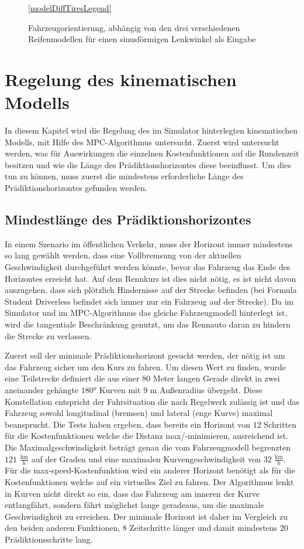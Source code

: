 \documentclass{like}
\begin{document}
\begin{figure}
	\centering
	 
	\ref{modelDiffTiresLegend}
	\caption{Fahrzeugorientierung, abhängig von den drei verschiedenen Reifenmodellen für einen sinusförmigen Lenkwinkel als Eingabe}
	\label{fig:modelDiffTires}
\end{figure}

\newpage
\section{Regelung des kinematischen Modells}
In diesem Kapitel wird die Regelung des im Simulator hinterlegten kinematischen Modells, mit Hilfe des \ac{MPC}-Algorithmus untersucht. Zuerst wird untersucht werden, was für Auswirkungen die einzelnen Kostenfunktionen auf die Rundenzeit besitzen und wie die Länge des Prädiktionshorizontes diese beeinflusst.
Um dies tun zu können, muss zuerst die mindestens erforderliche Länge des Prädiktionshorizontes gefunden werden. 

\subsection{Mindestlänge des Prädiktionshorizontes} 
In einem Szenario im öffentlichen Verkehr, muss der Horizont immer mindestens so lang gewählt werden, dass eine Vollbremsung von der aktuellen Geschwindigkeit durchgeführt werden könnte, bevor das Fahrzeug das Ende des Horizontes erreicht hat. Auf dem Rennkurs ist dies nicht nötig, es ist nicht davon auszugehen, dass sich plötzlich Hindernisse auf der Strecke befinden (bei Formula Student Driverless befindet sich immer nur ein Fahrzeug auf der Strecke). Da im Simulator und im \ac{MPC}-Algorithmus das gleiche Fahrzeugmodell hinterlegt ist, wird die tangentiale Beschränkung genutzt, um das Rennauto daran zu hindern die Strecke zu verlassen.

Zuerst soll der minimale Prädiktionshorizont gesucht werden, der nötig ist um das Fahrzeug sicher um den Kurs zu fahren. Um diesen Wert zu finden, wurde eine Teilstrecke definiert die aus einer $80$ Meter langen Gerade direkt in zwei aneinander gehängte $180$° Kurven mit $9$ m Außenradius übergeht. Diese Konstellation entspricht der Fahrsituation die nach Regelwerk zulässig ist und das Fahrzeug sowohl longitudinal (bremsen) und lateral (enge Kurve) maximal beansprucht. Die Tests haben ergeben, dass bereits ein Horizont von $12$ Schritten für die Kostenfunktionen welche die Distanz max/-minimieren, ausreichend ist. Die Maximalgeschwindigkeit beträgt genau die vom Fahrzeugmodell begrenzten $121$ $\frac{\text{km}}{\text{h}}$ auf der Graden und eine maximalen Kurvengeschwindigkeit von $32$ $\frac{\text{km}}{\text{h}}$. 
Für die max-speed-Kostenfunktion wird ein anderer Horizont benötigt als für die Kostenfunktionen welche auf ein virtuelles Ziel zu fahren. Der Algorithmus lenkt in Kurven nicht direkt so ein, dass das Fahrzeug am inneren der Kurve entlangfährt, sondern fährt möglichst lange geradeaus, um die maximale Geschwindigkeit zu erreichen. Der minimale Horizont ist daher im Vergleich zu den beiden anderen Funktionen, $8$ Zeitschritte länger und damit mindestens $20$ Prädiktionsschritte lang.
\end{document}
